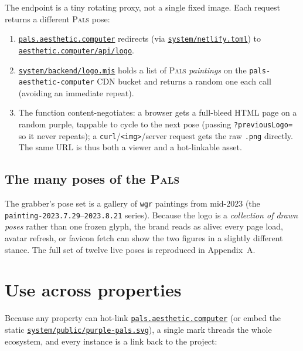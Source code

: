 \documentclass[10pt,letterpaper,twocolumn]{article}
\newcommand{\pals}{\textsc{Pals}}
\newcommand{\repofile}[1]{\href{https://github.com/whistlegraph/aesthetic-computer/blob/main/#1}{\texttt{#1}}}
\begin{document}
The endpoint is a tiny rotating proxy, not a single fixed image. Each
request returns a different \pals{} pose:

\begin{enumerate}
  \item \href{https://pals.aesthetic.computer}{\texttt{pals.aesthetic.computer}}
        redirects (via \repofile{system/netlify.toml}) to
        \href{https://aesthetic.computer/api/logo}{\texttt{aesthetic.computer/api/logo}}.
  \item \repofile{system/backend/logo.mjs} holds a list of \pals{}
        \emph{paintings} on the \texttt{pals-aesthetic-computer} CDN
        bucket and returns a random one each call (avoiding an immediate
        repeat).
  \item The function content-negotiates: a browser gets a full-bleed HTML
        page on a random purple, tappable to cycle to the next pose
        (passing \texttt{?previousLogo=} so it never repeats); a
        \texttt{curl}/\texttt{<img>}/server request gets the raw
        \texttt{.png} directly. The same URL is thus both a viewer and a
        hot-linkable asset.
\end{enumerate}

\subsection{The many poses of the \pals{}}

The grabber's pose set is a gallery of \texttt{wgr} paintings from
mid-2023 (the \texttt{painting-2023.7.29}--\texttt{2023.8.21} series).
Because the logo is a \emph{collection of drawn poses} rather than one
frozen glyph, the brand reads as alive: every page load, avatar refresh,
or favicon fetch can show the two figures in a slightly different stance.
The full set of twelve live poses is reproduced in Appendix~A.

\section{Use across properties}

Because any property can hot-link
\href{https://pals.aesthetic.computer}{\texttt{pals.aesthetic.computer}}
(or embed the static
\repofile{system/public/purple-pals.svg}), a single mark threads the
whole ecosystem, and every instance is a link back to the project:
\end{document}
